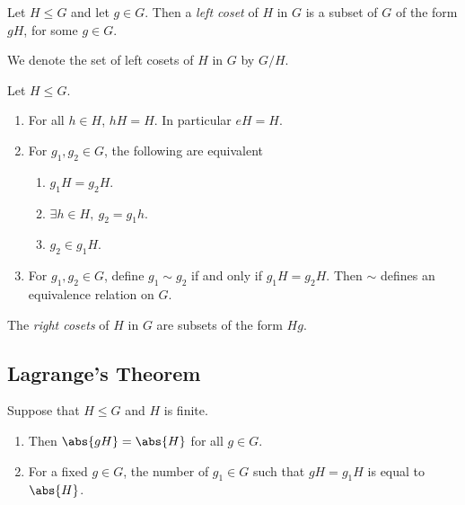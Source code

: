 \documentclass{article}
\begin{document}
\setcounter{theorem}{3}
\begin{definition}
    Let $H\leq G$ and let $g\in G$. Then a \emph{left coset} of $H$
    in $G$ is a subset of $G$ of the form $gH$, for some $g\in G$.
\end{definition}

\setcounter{theorem}{5}
\begin{definition}
    We denote the set of left cosets of $H$ in $G$ by $G/H$.
\end{definition}

\setcounter{theorem}{7}
\begin{theorem}
    Let $H\leq G$.
    \begin{enumerate}
        \item For all $h\in H$, $hH=H$. In particular $eH=H$.
        \item For $g_1,g_2\in G$, the following are equivalent \begin{enumerate}
            \item $g_1H=g_2H$.
            \item $\exists h\in H,\: g_2 = g_1h$.
            \item $g_2\in g_1 H$.
        \end{enumerate}
        \item For $g_1,g_2\in G$, define $g_1\sim g_2$ if and only if $g_1H=g_2H$.
        Then $\sim$ defines an equivalence relation on $G$.
    \end{enumerate}
\end{theorem}

\begin{definition}
    The \emph{right cosets} of $H$ in $G$ are subsets of the form $Hg$.
\end{definition}

\subsection{Lagrange's Theorem}

\begin{lemma}
    Suppose that $H\leq G$ and $H$ is finite.
    \begin{enumerate}
        \item Then $\abs{gH}=\abs{H}$ for all $g\in G$.
        \item For a fixed $g\in G$, the number of $g_1\in G$ 
        such that $gH=g_1H$ is equal to $\abs{H}$.
    \end{enumerate}
\end{lemma}
\end{document}

